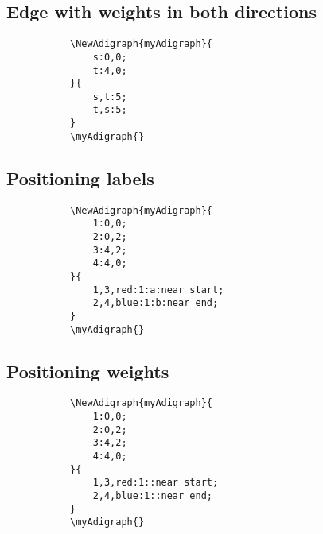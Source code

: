 \documentclass{report}
\begin{document}
\subsection{Edge with weights in both directions}
\begin{figure}
	\begin{subfigure}{0.49\textwidth}
		\begin{verbatim}
\NewAdigraph{myAdigraph}{
 	s:0,0;
 	t:4,0;
}{
	s,t:5;
	t,s:5;
}
\myAdigraph{}
\end{verbatim}
	\end{subfigure}
	\begin{subfigure}{0.49\textwidth}
		\myAdigraph{}
	\end{subfigure}
\end{figure}

\subsection{Positioning labels}
\begin{figure}
	\begin{subfigure}{0.49\textwidth}
		\begin{verbatim}
\NewAdigraph{myAdigraph}{
	1:0,0;
	2:0,2;
	3:4,2;
	4:4,0;
}{
	1,3,red:1:a:near start;
	2,4,blue:1:b:near end;
}
\myAdigraph{}
\end{verbatim}
	\end{subfigure}
	\begin{subfigure}{0.49\textwidth}
		\myAdigraph{}
	\end{subfigure}
\end{figure}

\subsection{Positioning weights}
\begin{figure}
	\begin{subfigure}{0.49\textwidth}
		\begin{verbatim}
\NewAdigraph{myAdigraph}{
	1:0,0;
	2:0,2;
	3:4,2;
	4:4,0;
}{
	1,3,red:1::near start;
	2,4,blue:1::near end;
}
\myAdigraph{}
\end{verbatim}
	\end{subfigure}
	\begin{subfigure}{0.49\textwidth}
		\myAdigraph{}
	\end{subfigure}
\end{figure}
\end{document}
